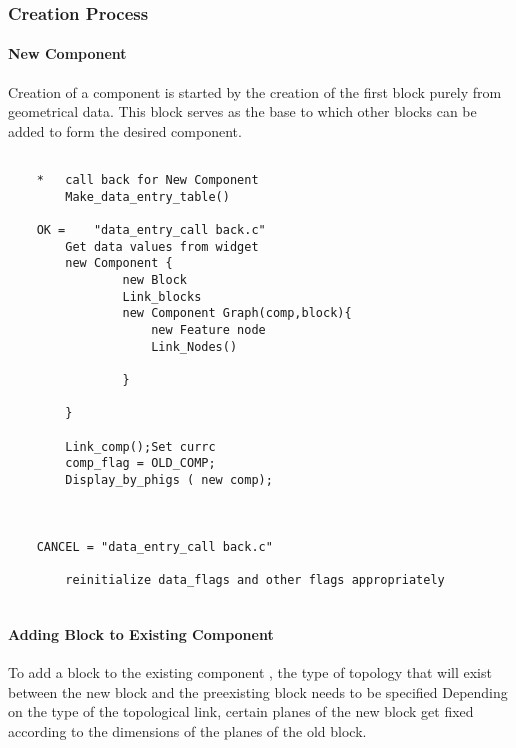     \subsubsection{Creation Process }
 
    \paragraph{New Component}
 
        Creation of a component is started by the creation of the first block
    purely from geometrical data. This block serves as the base to which other
    blocks can be added to form the desired component.
 
 
    \begin{verbatim}
 
    *   call back for New Component
        Make_data_entry_table()
 
    OK =    "data_entry_call back.c"
        Get data values from widget
        new Component {
                new Block
                Link_blocks
                new Component Graph(comp,block){
                    new Feature node
                    Link_Nodes()
 
                }
 
        }
 
        Link_comp();Set currc
        comp_flag = OLD_COMP;
        Display_by_phigs ( new comp);
 
 
 
    CANCEL = "data_entry_call back.c"
 
        reinitialize data_flags and other flags appropriately
 
    \end{verbatim}
 
 
    \paragraph{Adding Block to Existing Component}
 
    To add a block to the existing component , the type of topology that will
    exist between the new block and the preexisting block needs to be specified
    Depending on the type of the topological link, certain planes of the new
    block get fixed according to the dimensions of the planes of the old block.
 
